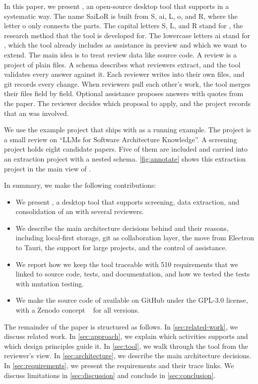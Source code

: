 In this paper, we present \SaiLoR, an open-source desktop tool that supports \SLRs in a systematic way.
The name SaiLoR is built from S, ai, L, o, and R, where the letter o only connects the parts.
The capital letters S, L, and R stand for \SLR, the research method that the tool is developed for.
The lowercase letters ai stand for \AI, which the tool already includes as \LLM assistance in preview and which we want to extend.
The main idea is to treat review data like source code.
A review is a project of plain \JSON files.
A schema describes what reviewers extract, and the tool validates every answer against it.
Each reviewer writes into their own files, and git records every change.
When reviewers pull each other's work, the tool merges their files field by field.
Optional \LLM assistance proposes answers with quotes from the paper.
The reviewer decides which proposal to apply, and the project records that an \LLM was involved.

We use the example project that ships with \SaiLoR as a running example.
The project is a small review on \enquote{LLMs for Software Architecture Knowledge}.
A screening project holds eight candidate papers.
Five of them are included and carried into an extraction project with a nested schema.
\autoref{fig:annotate} shows this extraction project in the main view of \SaiLoR.

In summary, we make the following contributions:
\begin{itemize}
    \item We present \SaiLoR, a desktop tool that supports screening, data extraction, and consolidation of an \SLR with several reviewers.
    \item We describe the main architecture decisions behind \SaiLoR and their reasons, including local-first storage, git as collaboration layer, the move from Electron to Tauri, the support for large projects, and the control of \LLM assistance.
    \item We report how we keep the tool traceable with 510 requirements that we linked to source code, tests, and documentation, and how we tested the tests with mutation testing.
    \item We make the source code of \SaiLoR available on GitHub under the GPL-3.0 license, with a Zenodo concept \DOI~\cite{sailor2026zenodo} for all versions.
\end{itemize}

The remainder of the paper is structured as follows.
In \autoref{sec:related-work}, we discuss related work.
In \autoref{sec:approach}, we explain which \SLR activities \SaiLoR supports and which design principles guide it.
In \autoref{sec:tool}, we walk through the tool from the reviewer's view.
In \autoref{sec:architecture}, we describe the main architecture decisions.
In \autoref{sec:requirements}, we present the requirements and their trace links.
We discuss limitations in \autoref{sec:discussion} and conclude in \autoref{sec:conclusion}.
